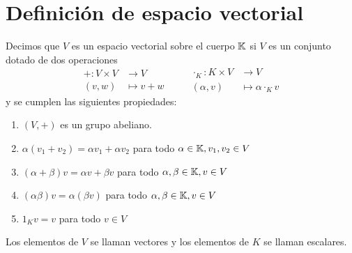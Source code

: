 \section{Definición de espacio vectorial}
\begin{definition}
	Decimos que \(V \) es un espacio vectorial sobre el cuerpo \(\mathbb{K} \) si \(V \) es un conjunto dotado de dos operaciones
	\[
		\begin{aligned}
			+\colon V \times V & \longrightarrow V \\
			(v,w)              & \longmapsto v + w
		\end{aligned} \qquad \begin{aligned}
			\cdot_K\colon K \times V & \longrightarrow  V           \\
			(\alpha, v)              & \longmapsto \alpha \cdot_K v
		\end{aligned}
	\]
	y se cumplen las siguientes propiedades:
	\begin{enumerate}
		\item \((V, + )\) es un grupo abeliano.
		\item \(\alpha(v_1 + v_2) = \alpha v_1 + \alpha v_2 \) para todo \(\alpha \in \mathbb{K}, v_1,v_2 \in V \)
		\item \((\alpha + \beta)v = \alpha v + \beta v 	\) para todo \(\alpha,\beta \in  \mathbb{K}, v \in V \)
		\item \((\alpha \beta)v = \alpha (\beta v)\) para todo \(\alpha, \beta \in \mathbb{K}, v \in V\)
		\item \(1_K v = v \) para todo \(v \in V \)
	\end{enumerate}
	Los elementos de \(V \) se llaman vectores y los elementos de \(K \) se llaman escalares.
\end{definition}
